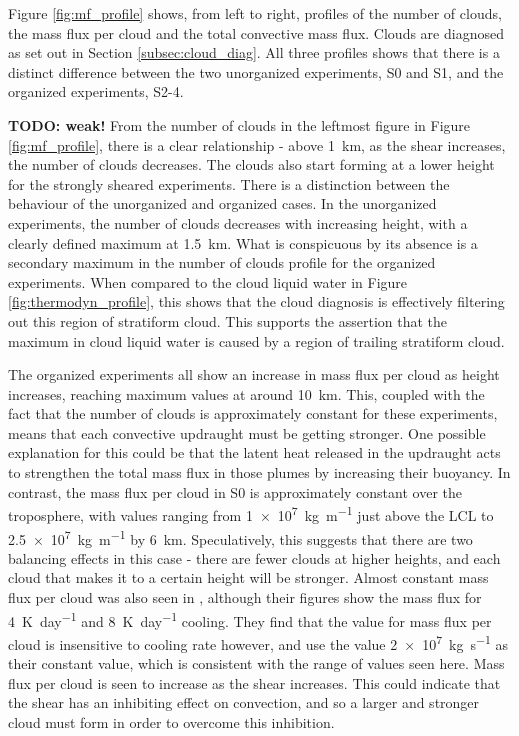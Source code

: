 \documentclass[11pt,a4paper]{article}
\newcommand\todo[1]{\textbf{TODO: #1}}
\begin{document}
Figure \ref{fig:mf_profile} shows, from left to right, profiles of the number of clouds, the mass flux per cloud and the total convective mass flux. Clouds are diagnosed as set out in Section \ref{subsec:cloud_diag}. All three profiles shows that there is a distinct difference between the two unorganized experiments, S0 and S1, and the organized experiments, S2-4. 

\todo{weak!}
From the number of clouds in the leftmost figure in Figure \ref{fig:mf_profile}, there is a clear relationship - above \SI{1}{km}, as the shear increases, the number of clouds decreases. The clouds also start forming at a lower height for the strongly sheared experiments. There is a distinction between the behaviour of the unorganized and organized cases. In the unorganized experiments, the number of clouds decreases with increasing height, with a clearly defined maximum at \SI{1.5}{km}. What is conspicuous by its absence is a secondary maximum in the number of clouds profile for the organized experiments. When compared to the cloud liquid water in Figure \ref{fig:thermodyn_profile}, this shows that the cloud diagnosis is effectively filtering out this region of stratiform cloud. This supports the assertion that the maximum in cloud liquid water is caused by a region of trailing stratiform cloud.

The organized experiments all show an increase in mass flux per cloud as height increases, reaching maximum values at around \SI{10}{km}. This, coupled with the fact that the number of clouds is approximately constant for these experiments, means that each convective updraught must be getting stronger. One possible explanation for this could be that the latent heat released in the updraught acts to strengthen the total mass flux in those plumes by increasing their buoyancy. In contrast, the mass flux per cloud in S0 is approximately constant over the troposphere, with values ranging from \SI{1e7}{kg.m^{-1}} just above the LCL to \SI{2.5e7}{kg.m^{-1}} by \SI{6}{km}. Speculatively, this suggests that there are two balancing effects in this case - there are fewer clouds at higher heights, and each cloud that makes it to a certain height will be stronger. Almost constant mass flux per cloud was also seen in \cite{PC2008}, although their figures show the mass flux for \SI{4}{K.day^{-1}} and \SI{8}{K.day^{-1}} cooling. They find that the value for mass flux per cloud is insensitive to cooling rate however, and use the value \SI{2e7}{kg.s^{-1}} as their constant value, which is consistent with the range of values seen here. Mass flux per cloud is seen to increase as the shear increases. This could indicate that the shear has an inhibiting effect on convection, and so a larger and stronger cloud must form in order to overcome this inhibition.
\end{document}
